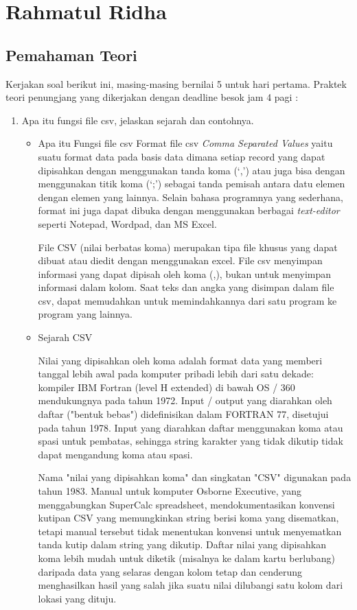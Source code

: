 \section{Rahmatul Ridha}
\subsection{Pemahaman Teori}
Kerjakan soal berikut ini, masing-masing bernilai 5 untuk hari pertama. Praktek teori penungjang yang dikerjakan dengan deadline besok jam 4 pagi :
\begin{enumerate}
	\item Apa itu fungsi file csv, jelaskan sejarah dan contohnya.
      	\begin{itemize}
         		\item Apa itu Fungsi file csv
         		Format file csv \textit{Comma Separated Values} yaitu suatu format data pada basis data dimana setiap record yang dapat dipisahkan dengan menggunakan tanda koma (`,’) atau juga bisa dengan menggunakan titik koma (`;’) sebagai tanda pemisah antara datu elemen dengan elemen yang lainnya. Selain bahasa programnya yang sederhana, format ini juga dapat dibuka dengan menggunakan berbagai \textit{text-editor} seperti Notepad, Wordpad, dan MS Excel.
  
	          File CSV (nilai berbatas koma) merupakan tipa file khusus yang dapat dibuat atau diedit dengan menggunakan excel. File csv menyimpan informasi yang dapat dipisah oleh koma (,), bukan untuk menyimpan informasi dalam kolom. Saat teks dan angka yang disimpan dalam file csv, dapat memudahkan untuk memindahkannya dari satu program ke program yang lainnya.
  
         		\item Sejarah CSV
  		
		Nilai yang dipisahkan oleh koma adalah format data yang memberi tanggal lebih awal pada komputer pribadi lebih dari satu dekade: kompiler IBM Fortran (level H extended) di bawah OS / 360 mendukungnya pada tahun 1972. Input / output yang diarahkan oleh daftar ("bentuk bebas") didefinisikan dalam FORTRAN 77, disetujui pada tahun 1978. Input yang diarahkan daftar menggunakan koma atau spasi untuk pembatas, sehingga string karakter yang tidak dikutip tidak dapat mengandung koma atau spasi.
  
	         Nama "nilai yang dipisahkan koma" dan singkatan "CSV" digunakan pada tahun 1983. Manual untuk komputer Osborne Executive, yang menggabungkan SuperCalc spreadsheet, mendokumentasikan konvensi kutipan CSV yang memungkinkan string berisi koma yang disematkan, tetapi manual tersebut tidak menentukan konvensi untuk menyematkan tanda kutip dalam string yang dikutip. Daftar nilai yang dipisahkan koma lebih mudah untuk diketik (misalnya ke dalam kartu berlubang) daripada data yang selaras dengan kolom tetap dan cenderung menghasilkan hasil yang salah jika suatu nilai dilubangi satu kolom dari lokasi yang dituju.
  		

\end{itemize}
\end{enumerate}
